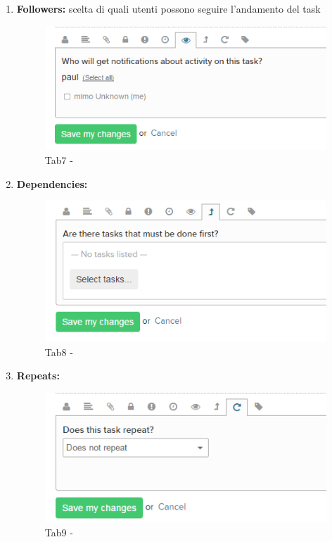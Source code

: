 \documentclass[a4paper,11pt]{article}
\begin{document}
\begin{enumerate}
		\item \textbf{Followers:} scelta di quali utenti possono seguire l'andamento del task
			\begin{figure}[H]
			\centering
			\includegraphics[scale=0.50]{../images/teamwork_task7.png}
			\caption{  Tab7 -  }	
			\end{figure}
			
		\item \textbf{Dependencies:} 
			\begin{figure}[H]
			\centering
			\includegraphics[scale=0.50]{../images/teamwork_task8.png}
			\caption{  Tab8 -  }	
			\end{figure}
			
		\item \textbf{Repeats:} 
			\begin{figure}[H]
			\centering
			\includegraphics[scale=0.50]{../images/teamwork_task9.png}
			\caption{  Tab9 -  }
			\end{figure}
			

\end{enumerate}
\end{document}
